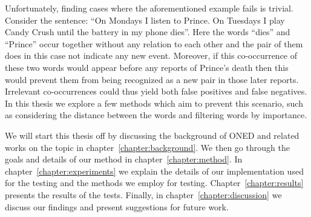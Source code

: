 Unfortunately, finding cases where the aforementioned example fails is trivial. Consider the sentence: ``On Mondays I listen to Prince. On Tuesdays I play Candy Crush until the battery in my phone dies''. Here the words ``dies'' and ``Prince'' occur together without any relation to each other and the pair of them does in this case not indicate any new event. Moreover, if this co-occurrence of these two words would appear before any reports of Prince's death then this would prevent them from being recognized as a new pair in those later reports. Irrelevant co-occurrences could thus yield both false positives and false negatives. In this thesis we explore a few methods which aim to prevent this scenario, such as considering the distance between the words and filtering words by importance.

We will start this thesis off by discussing the background of ONED and related works on the topic in chapter~\ref{chapter:background}. We then go through the goals and details of our method in chapter~\ref{chapter:method}. In chapter~\ref{chapter:experiments} we explain the details of our implementation used for the testing and the methods we employ for testing. Chapter~\ref{chapter:results} presents the results of the tests. Finally, in chapter~\ref{chapter:discussion} we discuss our findings and present suggestions for future work.

